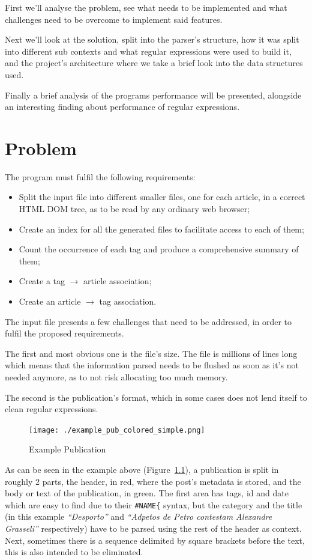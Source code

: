 \documentclass[a4paper]{report}
\begin{document}
First we'll analyse the problem, see what needs to be implemented and what
challenges need to be overcome to implement said features.

Next we'll look at the solution, split into the parser's structure, how it was
split into different sub contexts and what regular expressions were used to
build it, and the project's architecture where we take a brief look into the
data structures used.

Finally a brief analysis of the programs performance will be presented,
alongside an interesting finding about performance of regular expressions.

\chapter{Problem}

The program must fulfil the following requirements:
\begin{itemize}
    \item Split the input file into different smaller files, one for each
        article, in a correct HTML DOM tree, as to be read by any ordinary web
        browser;
    \item Create an index for all the generated files to facilitate access to
        each of them;
    \item Count the occurrence of each tag and produce a comprehensive summary
        of them;
    \item Create a tag $\to$ article association;
    \item Create an article $\to$ tag association.
\end{itemize}

The input file presents a few challenges that need to be addressed, in order to
fulfil the proposed requirements.

The first and most obvious one is the file's size. The file is millions of lines long
which means that the information parsed needs to be flushed as soon as it's not
needed anymore, as to not risk allocating too much memory.

The second is the publication's format, which in some cases does not lend
itself to clean regular expressions.

\begin{figure}[H]
    \texttt{[image: ./example\_pub\_colored\_simple.png]}
    \caption{Example Publication}\label{fig:example_pub_simple}
\end{figure}

As can be seen in the example above (Figure~\ref{fig:example_pub_simple}), a
publication is split in roughly 2 parts, the header, in red, where the post's
metadata is stored, and the body or text of the publication, in green. The first
area has tags, id and date which are easy to find due to their
\verb!#NAME{! syntax, but the category and the title (in this example
\textit{``Desporto''} and \textit{``Adpetos de Petro contestam Alexandre
Grasseli''} respectively) have to be parsed using the rest of the header as
context. Next, sometimes there is a sequence delimited by square brackets before
the text, this is also intended to be eliminated.
\end{document}
